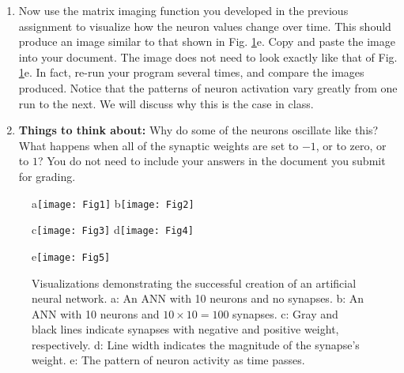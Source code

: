 \documentclass[12pt]{article}
\begin{document}
\begin{enumerate}
\item Now use the matrix imaging function you developed in the previous assignment to visualize how the neuron values change over time. This should produce an image similar to that shown in Fig. \ref{Fig}e. Copy and paste the image into your document. The image does not need to look exactly like that of Fig. \ref{Fig}e. In fact, re-run your program several times, and compare the images produced. Notice that the patterns of neuron activation vary greatly from one run to the next. We will discuss why this is the case in class.

\item \textbf{Things to think about:} Why do some of the neurons oscillate like this? What happens when all of the synaptic weights are set to $-1$, or to zero, or to $1$? You do not need to include your answers in the document you submit for grading.

\end{enumerate}

\begin{figure}[!t]
\centerline{
a\texttt{[image: Fig1]}
b\texttt{[image: Fig2]}
}
\centerline{
c\texttt{[image: Fig3]}
d\texttt{[image: Fig4]}
}
\centerline{
e\texttt{[image: Fig5]}
}
\caption{Visualizations demonstrating the successful creation of an artificial neural network.
a: An ANN with 10 neurons and no synapses.
b: An ANN with 10 neurons and $10 \times 10 = 100$ synapses.
c: Gray and black lines indicate synapses with negative and positive weight, respectively.
d: Line width indicates the magnitude of the synapse's weight.
e: The pattern of neuron activity as time passes.}
\label{Fig}
\end{figure}
\end{document}
